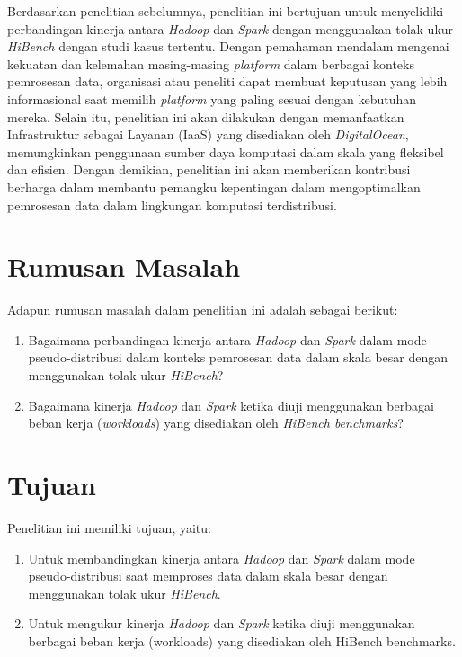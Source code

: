 
Berdasarkan penelitian sebelumnya, penelitian ini bertujuan untuk menyelidiki perbandingan kinerja antara \textit{Hadoop} dan \textit{Spark} dengan menggunakan tolak ukur \textit{HiBench} dengan studi kasus tertentu. Dengan pemahaman mendalam mengenai kekuatan dan kelemahan masing-masing \textit{platform} dalam berbagai konteks pemrosesan data, organisasi atau peneliti dapat membuat keputusan yang lebih informasional saat memilih \textit{platform} yang paling sesuai dengan kebutuhan mereka. Selain itu, penelitian ini akan dilakukan dengan memanfaatkan Infrastruktur sebagai Layanan (IaaS) yang disediakan oleh \textit{DigitalOcean}, memungkinkan penggunaan sumber daya komputasi dalam skala yang fleksibel dan efisien. Dengan demikian, penelitian ini akan memberikan kontribusi berharga dalam membantu pemangku kepentingan dalam mengoptimalkan pemrosesan data dalam lingkungan komputasi terdistribusi.


\section{Rumusan Masalah}
Adapun rumusan masalah dalam penelitian ini adalah sebagai berikut:
\begin{enumerate}{\tiny }
	\item 
	Bagaimana perbandingan kinerja antara \textit{Hadoop} dan \textit{Spark} dalam mode pseudo-distribusi dalam konteks pemrosesan data dalam skala besar dengan menggunakan tolak ukur \textit{HiBench}?
	\item
	Bagaimana kinerja \textit{Hadoop} dan \textit{Spark} ketika diuji menggunakan berbagai beban kerja (\textit{workloads}) yang disediakan oleh \textit{HiBench benchmarks}?
\end{enumerate}

\section{Tujuan}
Penelitian ini memiliki tujuan, yaitu:
	\begin{enumerate}
		\item 
		Untuk membandingkan kinerja antara \textit{Hadoop} dan \textit{Spark} dalam mode pseudo-distribusi saat memproses data dalam skala besar dengan menggunakan tolak ukur \textit{HiBench}.
		\item
		Untuk mengukur kinerja \textit{Hadoop} dan \textit{Spark} ketika diuji menggunakan berbagai beban kerja (workloads) yang disediakan oleh HiBench benchmarks.
	\end{enumerate}


